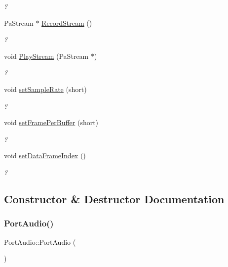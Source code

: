 \begin{DoxyCompactItemize}
\begin{DoxyCompactList}\small\item\em ? \end{DoxyCompactList}\item 
Pa\+Stream $\ast$ \hyperlink{class_port_audio_a0096f886eec6c33ae24b4610f9ee3fcb}{Record\+Stream} ()
\begin{DoxyCompactList}\small\item\em ? \end{DoxyCompactList}\item 
void \hyperlink{class_port_audio_ac3d84aa081e68ed4b6b32e901a25ea8c}{Play\+Stream} (Pa\+Stream $\ast$)
\begin{DoxyCompactList}\small\item\em ? \end{DoxyCompactList}\item 
void \hyperlink{class_port_audio_a8d6e5890ce34df315cbb76b2399d1876}{set\+Sample\+Rate} (short)
\begin{DoxyCompactList}\small\item\em ? \end{DoxyCompactList}\item 
void \hyperlink{class_port_audio_ad86fa6db404b8f563b7eb92c1b4359b5}{set\+Frame\+Per\+Buffer} (short)
\begin{DoxyCompactList}\small\item\em ? \end{DoxyCompactList}\item 
void \hyperlink{class_port_audio_a42e4b5882022a7ccd8696d9656ea686d}{set\+Data\+Frame\+Index} ()
\begin{DoxyCompactList}\small\item\em ? \end{DoxyCompactList}\end{DoxyCompactItemize}


\subsection{Constructor \& Destructor Documentation}
\mbox{\label{class_port_audio_ad5640eccbb52a46880bf424f26d1809f}} 
\subsubsection{\texorpdfstring{Port\+Audio()}{PortAudio()}}
{\footnotesize\ttfamily Port\+Audio\+::\+Port\+Audio (\begin{DoxyParamCaption}{ }\end{DoxyParamCaption})}



